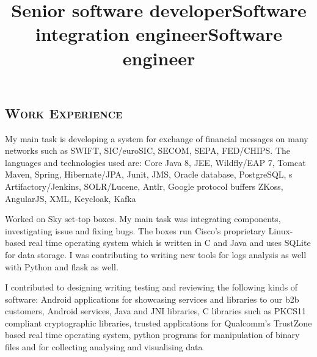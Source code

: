 \begin{resume}
        \section{\textsc{Work Experience}}
        \title{Senior software developer}
        \begin{position}
            My main task is developing a system for exchange of financial messages on many networks such as SWIFT, SIC/euroSIC, SECOM, SEPA, FED/CHIPS.
            The languages and technologies used are: %
            Core Java 8, JEE, 
            Wildfly/EAP 7, Tomcat
            Maven, Spring, Hibernate/JPA, 
            Junit,
            JMS,
            Oracle database, PostgreSQL,
            s Artifactory/Jenkins,
            SOLR/Lucene,
            Antlr,
            Google protocol buffers
            ZKoss,
            AngularJS,
            XML,
            Keycloak,
            Kafka
        \end{position}


        \title{Software integration engineer}
        \begin{position}
            Worked on Sky set-top boxes.
            My main task was integrating components, investigating issue and fixing bugs.
            The boxes run Cisco's proprietary Linux-based real time operating system which is written in C and Java
            and uses SQLite for data storage.
            I was contributing to writing new tools for logs analysis as well with Python and flask as well.
        \end{position}

        \title{Software engineer}
        \begin{position}
            I contributed to designing writing testing and reviewing the following kinds of software:
            Android applications for showcasing services and libraries to our b2b customers,
            Android services,
            Java and JNI libraries,
            C libraries such as PKCS11 compliant cryptographic libraries,
            trusted applications for Qualcomm's TrustZone based real time operating system,
            python programs for manipulation of binary files and for collecting analysing and visualising data


\end{position}
\end{resume}
